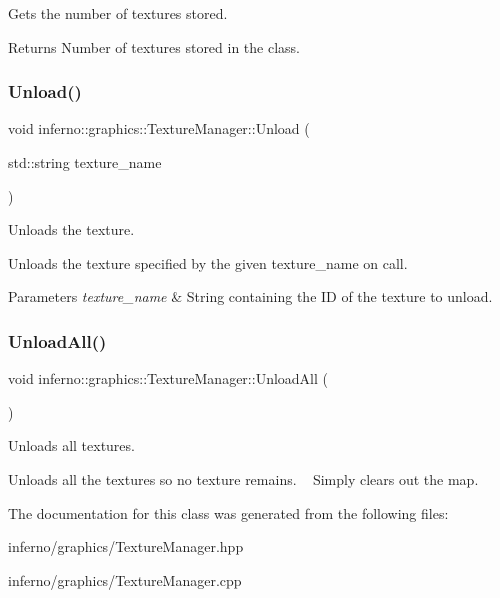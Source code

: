 Gets the number of textures stored. 

\begin{DoxyReturn}{Returns}
Number of textures stored in the class. 
\end{DoxyReturn}
\mbox{\label{classinferno_1_1graphics_1_1_texture_manager_af860bd092645a0c99afa35d3e978f3d8}} 
\subsubsection{\texorpdfstring{Unload()}{Unload()}}
{\footnotesize\ttfamily void inferno\+::graphics\+::\+Texture\+Manager\+::\+Unload (\begin{DoxyParamCaption}\item[{std\+::string}]{texture\+\_\+name }\end{DoxyParamCaption})}



Unloads the texture. 

Unloads the texture specified by the given texture\+\_\+name on call. 
\begin{DoxyParams}{Parameters}
{\em texture\+\_\+name} & String containing the ID of the texture to unload. \\
\hline
\end{DoxyParams}
\mbox{\label{classinferno_1_1graphics_1_1_texture_manager_ab3f3fbf66a7c133ed129e1433b1c7cee}} 
\subsubsection{\texorpdfstring{Unload\+All()}{UnloadAll()}}
{\footnotesize\ttfamily void inferno\+::graphics\+::\+Texture\+Manager\+::\+Unload\+All (\begin{DoxyParamCaption}{ }\end{DoxyParamCaption})}



Unloads all textures. 

Unloads all the textures so no texture remains. ~\newline
Simply clears out the map. 

The documentation for this class was generated from the following files\+:\begin{DoxyCompactItemize}
\item 
inferno/graphics/Texture\+Manager.\+hpp\item 
inferno/graphics/Texture\+Manager.\+cpp\end{DoxyCompactItemize}
